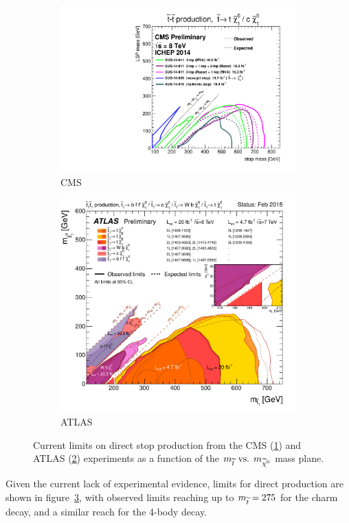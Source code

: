 \begin{figure}[h!]
  \centering
  \begin{subfigure}[b]{0.46\textwidth} %
    \includegraphics[width=\textwidth]{Figs/other_limits/T2tt_ICHEP2014_All.pdf}
    \caption{CMS}
    \label{fig:cms_current_limit}
  \end{subfigure}
  \begin{subfigure}[b]{0.46\textwidth}
    \includegraphics[width=\textwidth]{Figs/other_limits/ATLAS_SUSY_Stop_tLSP.pdf}
    \caption{ATLAS}
    \label{fig:atlas_current_limit}
  \end{subfigure}
  \caption{Current limits on direct stop production from the CMS
  (\ref{fig:cms_current_limit})\cite{cmssusyresults} and ATLAS
  (\ref{fig:atlas_current_limit})\cite{atlassusyresults}
  experiments as a function of the $m_{\widetilde{t}} \text{ vs. } m_{\widetilde{\chi}^{0}}$ mass
  plane.}
  \label{fig:current_limits}
\end{figure}

Given the current lack of experimental evidence, limits for direct \sTop
production are shown in figure~\ref{fig:current_limits}, with observed limits
reaching up to $m_{\widetilde{t}} = 275$ \gev for the charm decay, and a similar reach
for the 4-body decay.

